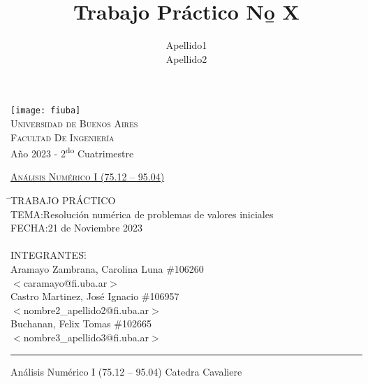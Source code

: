 \documentclass[12pt]{article}
\title{Trabajo Práctico N\b o X}
\author{Apellido1\\Apellido2}
\numberwithin{equation}{section}
\numberwithin{figure}{section}
\numberwithin{table}{section}
\begin{document}
%
%
\pagestyle{fancy}
\renewcommand{\sectionmark}[1]{\markboth{}{\thesection\ \ #1}}
\lhead{}
\chead{}
\rhead{\rightmark}
\lfoot{}
\cfoot{}
\rfoot{\thepage}

%
%
\begin{titlepage}

\thispagestyle{empty}

\begin{center}
\texttt{[image: fiuba]}\\
\large{\textsc{Universidad de Buenos Aires}}\\
\large{\textsc{Facultad De Ingeniería}}\\
\small{Año 2023 - 2\textsuperscript{do} Cuatrimestre}
\end{center}

\vfill

\begin{center}
\Large{\underline{\textsc{Análisis Numérico I (75.12 – 95.04)}}}
\end{center}

\vfill

\begin{tabbing}
\hspace{2cm}\=\+TRABAJO PRÁCTICO\\
	TEMA:Resolución numérica de problemas de valores iniciales\\
	FECHA:21 de Noviembre 2023\\%
\\
	INTEGRANTES:\hspace{-1cm}\=\+\hspace{1cm}\=\hspace{6cm}\=\\
		Aramayo Zambrana, Carolina Luna	\>\> \#106260\\
			\>\footnotesize{$<$caramayo@fi.uba.ar$>$}\\
		Castro Martinez, José Ignacio	\>\> \#106957\\
			\>\footnotesize{$<$nombre2\_apellido2@fi.uba.ar$>$}\\
		Buchanan, Felix Tomas	\>\> \#102665\\
			\>\footnotesize{$<$nombre3\_apellido3@fi.uba.ar$>$}\\
\end{tabbing}

\vfill

\hrule
\vspace{0.2cm}

\noindent\small{Análisis Numérico I (75.12 – 95.04) \hfill Catedra Cavaliere}

\end{titlepage}
\end{document}
